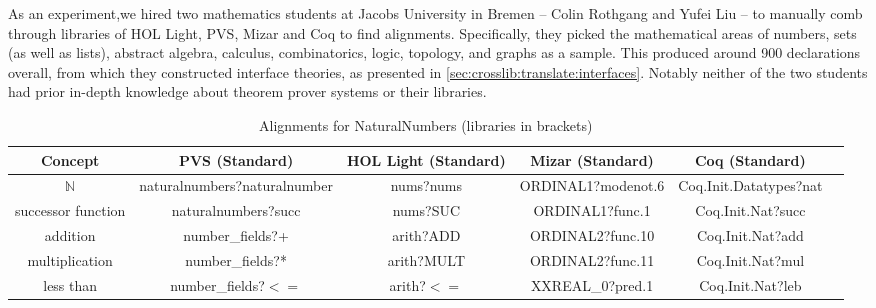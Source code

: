 As an experiment,we hired two mathematics students at Jacobs University in Bremen -- Colin Rothgang and Yufei Liu -- to manually comb through libraries of HOL Light, PVS, Mizar and Coq to find alignments.
Specifically, they picked the mathematical areas of numbers, sets (as well as lists), abstract algebra, calculus, combinatorics, logic, topology, and graphs as a sample.
This produced around 900 declarations overall, from which they constructed interface theories, as presented in \autoref{sec:crosslib:translate:interfaces}. Notably neither of the two students had prior in-depth knowledge about theorem prover systems or their libraries.

\begin{table}[ht]\centering\tiny
	\begin{tabular}{|c|c|c|c|c|c|}\hline
		Concept & PVS (Standard)& HOL Light (Standard)& Mizar (Standard) & Coq (Standard)\\\hline
		$\mathbb N$ & \textsf{naturalnumbers?naturalnumber} & \textsf{nums?nums} & \textsf{ORDINAL1?modenot.6}& \textsf{Coq.Init.Datatypes?nat}\\
		successor function & \textsf{naturalnumbers?succ} & \textsf{nums?SUC} & \textsf{ORDINAL1?func.1} & \textsf{Coq.Init.Nat?succ}\\
	 	\textsf{addition} & \textsf{number\_fields?+} & \textsf{arith?ADD} & \textsf{ORDINAL2?func.10} & \textsf{Coq.Init.Nat?add}\\
		\textsf{multiplication} & \textsf{number\_fields?*} & \textsf{arith?MULT} & \textsf{ORDINAL2?func.11}& \textsf{Coq.Init.Nat?mul} \\
		less than & \textsf{number\_fields?$<=$} & \textsf{arith?$<=$} & \textsf{XXREAL\_0?pred.1}& \textsf{Coq.Init.Nat?leb} \\\hline
	\end{tabular}
	\caption{Alignments for \textsf{NaturalNumbers} (libraries in brackets)}\label{tbl:natalignments}
\end{table}

